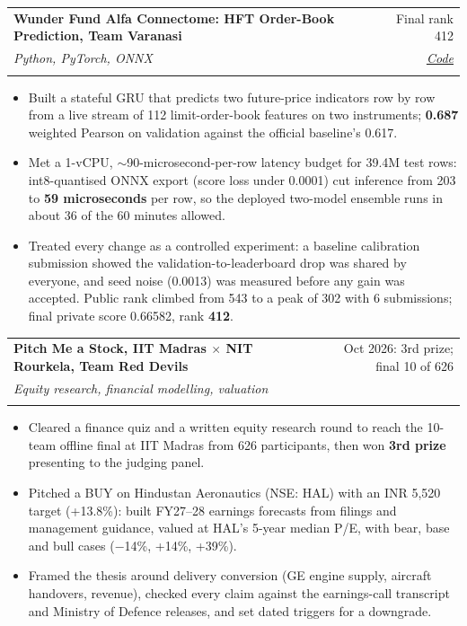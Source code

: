 \documentclass[letterpaper,10pt]{article}
\makeatletter
\newcommand{\entry}[4]{%
  \vspace{2pt}
  \begin{tabularx}{\linewidth}{@{}X@{\hspace{6pt}}r@{}}
    \textbf{#1} & #2 \\
    \if\relax\detokenize{#3}\relax\else \textit{\small #3} & \textit{\small #4} \\ \fi
  \end{tabularx}\vspace{-3pt}
}
\newcommand{\metric}[1]{\textbf{#1}}
\makeatother
\begin{document}
\entry{Wunder Fund Alfa Connectome: HFT Order-Book Prediction, Team Varanasi}{Final rank 412}
      {Python, PyTorch, ONNX}{\href{https://github.com/Lnvqntx/Varanasi-lob-ml}{\underline{Code}}}
\begin{itemize}
  \item Built a stateful GRU that predicts two future-price indicators row by row from a live stream of 112 limit-order-book
        features on two instruments; \metric{0.687} weighted Pearson on validation against the official baseline's 0.617.
  \item Met a 1-vCPU, $\sim$90-microsecond-per-row latency budget for 39.4M test rows: int8-quantised ONNX export (score
        loss under 0.0001) cut inference from 203 to \metric{59 microseconds} per row, so the deployed two-model ensemble runs in about 36
        of the 60 minutes allowed.
  \item Treated every change as a controlled experiment: a baseline calibration submission showed the
        validation-to-leaderboard drop was shared by everyone, and seed noise (0.0013) was measured before any gain
        was accepted. Public rank climbed from 543 to a peak of 302 with 6 submissions; final private score 0.66582, rank \metric{412}.
\end{itemize}

\entry{Pitch Me a Stock, IIT Madras $\times$ NIT Rourkela, Team Red Devils}{Oct 2026: 3rd prize; final 10 of 626}
      {Equity research, financial modelling, valuation}{}
\begin{itemize}
  \item Cleared a finance quiz and a written equity research round to reach the 10-team offline final at IIT Madras from 626
        participants, then won \metric{3rd prize} presenting to the judging panel.
  \item Pitched a BUY on Hindustan Aeronautics (NSE: HAL) with an INR 5,520 target (+13.8\%): built FY27--28 earnings
        forecasts from filings and management guidance, valued at HAL's 5-year median P/E, with bear, base and bull
        cases ($-$14\%, +14\%, +39\%).
  \item Framed the thesis around delivery conversion (GE engine supply, aircraft handovers, revenue), checked every
        claim against the earnings-call transcript and Ministry of Defence releases, and set dated triggers for a downgrade.
\end{itemize}
\end{document}
